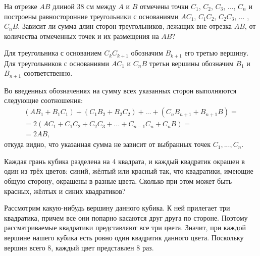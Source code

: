 \begin{itemize}

\itB На отрезке $AB$ длиной 38 см между $A$ и $B$ отмечены точки $C_1$, $C_2$, $C_3$, ..., $C_n$ и построены равносторонние треугольники с основаниями $AC_1$, $C_1C_2$, $C_2C_3$, ... , $C_nB$. Зависит ли сумма длин сторон треугольников, лежащих вне отрезка $AB$, от количества отмеченных точек и их размещения на $AB$?

\itr Для треугольника с основанием $C_{k}C_{k+1}$ обозначим $B_{k+1}$ его третью вершину. Для треугольников с основаниями $AC_1$ и $C_nB$ третьи вершины обозначим $B_1$ и $B_{n+1}$ соответственно. 

\begin{center}\end{center}

Во введенных обозначениях на сумму всех указанных сторон выполняются следующие соотношения:
$$
\begin{array}{l}
(AB_1+B_1C_1)+(C_1B_2+B_2C_2)+...+(C_nB_{n+1}+B_{n+1}B)=\\
=2(AC_1+C_1C_2+C_2C_3+...+C_{n-1}C_n+C_nB)=\\
=2AB,
\end{array}$$
откуда видно, что указанная сумма не зависит от выбранных точек $C_1,...,C_n$.


\itC Каждая грань кубика разделена на 4 квадрата, и каждый квадратик окрашен в один из трёх цветов: синий, жёлтый или красный так, что квадратики, имеющие общую сторону, окрашены в разные цвета. Сколько при этом может быть красных, жёлтых и синих квадратиков?

\itr Рассмотрим какую-нибудь вершину данного кубика. 
К ней прилегает три квадратика, причем все они попарно касаются друг друга по стороне. 
Поэтому рассматриваемые квадратики представляют все три цвета. Значит, при каждой вершине 
нашего кубика есть ровно один квадратик данного цвета. Поскольку вершин всего 8, каждый 
цвет представлен 8 раз.

\end{itemize}
